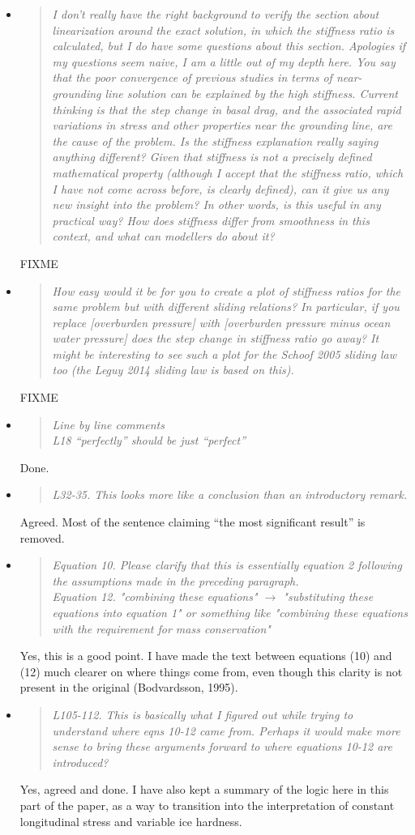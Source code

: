 \documentclass[11pt,reqno]{amsart}
\newcommand{\reply}[2]{
\medskip\medskip
\item  \begin{quote}
\emph{#1}
\end{quote}

\smallskip
\noindent #2}
\begin{document}
\begin{itemize}
\reply{I don't really have the right background to verify the section about linearization around the exact solution, in which the stiffness ratio is calculated, but I do have some questions about this section. Apologies if my questions seem naive, I am a little out of my depth here. You say that the poor convergence of previous studies in terms of near-grounding line solution can be explained by the high stiffness. Current thinking is that the step change in basal drag, and the associated rapid variations in stress and other properties near the grounding line, are the cause of the problem. Is the stiffness explanation really saying anything different? Given that stiffness is not a precisely defined mathematical property (although I accept that the stiffness ratio, which I have not come across before, is clearly defined), can it give us any new insight into the problem? In other words, is this useful in any practical way? How does stiffness differ from smoothness in this context, and what can modellers do about it?}{FIXME}

\reply{How easy would it be for you to create a plot of stiffness ratios for the same problem but with different sliding relations? In particular, if you replace [overburden pressure] with [overburden pressure minus ocean water pressure] does the step change in stiffness ratio go away? It might be interesting to see such a plot for the Schoof 2005 sliding law too (the Leguy 2014 sliding law is based on this).}{FIXME}

\reply{Line by line comments \smallskip \\
L18 ``perfectly'' should be just ``perfect''}
{Done.}

\reply{L32-35. This looks more like a conclusion than an introductory remark.}
{Agreed.  Most of the sentence claiming ``the most significant result'' is removed.}

\reply{Equation 10. Please clarify that this is essentially equation 2 following the assumptions made in the preceding paragraph. \smallskip \\
Equation 12. "combining these equations" $\to$ "substituting these equations into equation 1" or something like "combining these equations with the requirement for mass conservation"}
{Yes, this is a good point.  I have made the text between equations (10) and (12) much clearer on where things come from, even though this clarity is not present in the original (Bodvardsson, 1995).}

\reply{L105-112. This is basically what I figured out while trying to understand where eqns 10-12 came from. Perhaps it would make more sense to bring these arguments forward to where equations 10-12 are introduced?}
{Yes, agreed and done.  I have also kept a summary of the logic here in this part of the paper, as a way to transition into the interpretation of constant longitudinal stress and variable ice hardness.}


\end{itemize}
\end{document}
